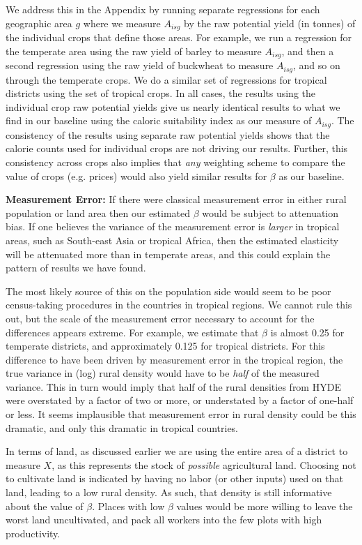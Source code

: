 \documentclass[11pt]{article}
\begin{document}
We address this in the Appendix by running separate regressions for each geographic area $g$ where we measure $A_{isg}$ by the raw potential yield (in tonnes) of the individual crops that define those areas. For example, we run a regression for the temperate area using the raw yield of barley to measure $A_{isg}$, and then a second regression using the raw yield of buckwheat to measure $A_{isg}$, and so on through the temperate crops. We do a similar set of regressions for tropical districts using the set of tropical crops. In all cases, the results using the individual crop raw potential yields give us nearly identical results to what we find in our baseline using the caloric suitability index as our measure of $A_{isg}$. The consistency of the results using separate raw potential yields shows that the calorie counts used for individual crops are not driving our results. Further, this consistency across crops also implies that \textit{any} weighting scheme to compare the value of crops (e.g. prices) would also yield similar results for $\beta$ as our baseline.

\vspace{.5cm}\noindent\textbf{Measurement Error:} If there were classical measurement error in either rural population or land area then our estimated $\beta$ would be subject to attenuation bias. If one believes the variance of the measurement error is \textit{larger} in tropical areas, such as South-east Asia or tropical Africa, then the estimated elasticity will be attenuated more than in temperate areas, and this could explain the pattern of results we have found. 

The most likely source of this on the population side would seem to be poor census-taking procedures in the countries in tropical regions. We cannot rule this out, but the scale of the measurement error necessary to account for the differences appears extreme. For example, we estimate that $\beta$ is almost 0.25 for temperate districts, and approximately 0.125 for tropical districts. For this difference to have been driven by measurement error in the tropical region, the true variance in (log) rural density would have to be \textit{half} of the measured variance. This in turn would imply that half of the rural densities from HYDE were overstated by a factor of two or more, or understated by a factor of one-half or less. It seems implausible that measurement error in rural density could be this dramatic, and only this dramatic in tropical countries.

In terms of land, as discussed earlier we are using the entire area of a district to measure $X$, as this represents the stock of \textit{possible} agricultural land. Choosing not to cultivate land is indicated by having no labor (or other inputs) used on that land, leading to a low rural density. As such, that density is still informative about the value of $\beta$. Places with low $\beta$ values would be more willing to leave the worst land uncultivated, and pack all workers into the few plots with high productivity. 
\end{document}
